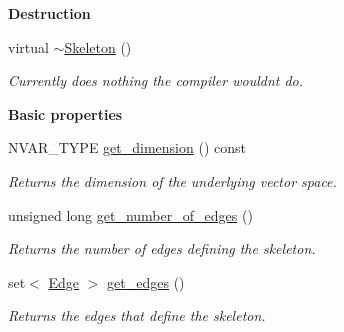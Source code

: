 \begin{Indent}\textbf{ Destruction}\par
\begin{DoxyCompactItemize}
\item 
\mbox{\label{group___c_l_s_solvers_a0da8ede73aea9089d7b81683c08cfc60}} 
virtual \hyperlink{group___c_l_s_solvers_a0da8ede73aea9089d7b81683c08cfc60}{$\sim$\+Skeleton} ()
\begin{DoxyCompactList}\small\item\em Currently does nothing the compiler wouldn\textquotesingle{}t do. \end{DoxyCompactList}\end{DoxyCompactItemize}
\end{Indent}
\begin{Indent}\textbf{ Basic properties}\par
\begin{DoxyCompactItemize}
\item 
\mbox{\label{group___c_l_s_solvers_acc02076b2e475b60d31104e15d4c982c}} 
N\+V\+A\+R\+\_\+\+T\+Y\+PE \hyperlink{group___c_l_s_solvers_acc02076b2e475b60d31104e15d4c982c}{get\+\_\+dimension} () const
\begin{DoxyCompactList}\small\item\em Returns the dimension of the underlying vector space. \end{DoxyCompactList}\item 
\mbox{\label{group___c_l_s_solvers_a310919f8faa248ffa479004d91c4defa}} 
unsigned long \hyperlink{group___c_l_s_solvers_a310919f8faa248ffa479004d91c4defa}{get\+\_\+number\+\_\+of\+\_\+edges} ()
\begin{DoxyCompactList}\small\item\em Returns the number of edges defining the skeleton. \end{DoxyCompactList}\item 
\mbox{\label{group___c_l_s_solvers_aac51e256cb56e7fe4844c206dcfcf35b}} 
set$<$ \hyperlink{group___c_l_s_solvers_class_l_p___solvers_1_1_edge}{Edge} $>$ \hyperlink{group___c_l_s_solvers_aac51e256cb56e7fe4844c206dcfcf35b}{get\+\_\+edges} ()
\begin{DoxyCompactList}\small\item\em Returns the edges that define the skeleton. \end{DoxyCompactList}\item 

\end{DoxyCompactItemize}
\end{Indent}

